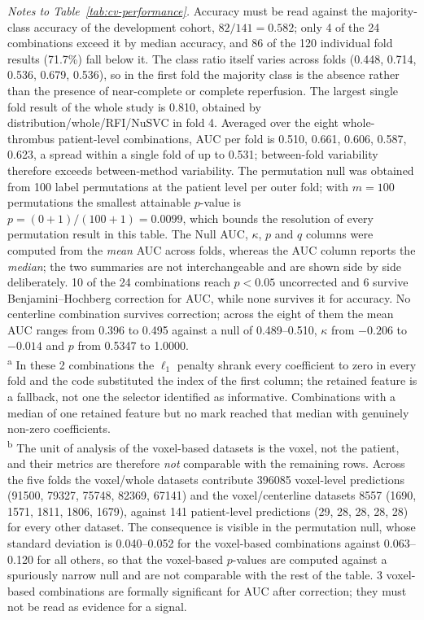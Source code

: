 \smallskip
{\footnotesize
\sloppy
\noindent
\textit{Notes to Table~\ref{tab:cv-performance}.}
Accuracy must be read against the majority-class accuracy of the development cohort, $82/141 = 0.582$; only 4 of the 24 combinations exceed it by median accuracy, and 86 of the 120 individual fold results (71.7\%) fall below it.
The class ratio itself varies across folds (0.448, 0.714, 0.536, 0.679, 0.536), so in the first fold the majority class is the absence rather than the presence of near-complete or complete reperfusion.
The largest single fold result of the whole study is 0.810, obtained by distribution/whole/RFI/NuSVC in fold 4.
Averaged over the eight whole-thrombus patient-level combinations, AUC per fold is 0.510, 0.661, 0.606, 0.587, 0.623, a spread within a single fold of up to 0.531; between-fold variability therefore exceeds between-method variability.
The permutation null was obtained from 100 label permutations at the patient level per outer fold; with $m = 100$ permutations the smallest attainable $p$-value is $p = (0+1)/(100+1) = 0.0099$, which bounds the resolution of every permutation result in this table.
The Null AUC, $\kappa$, $p$ and $q$ columns were computed from the \emph{mean} AUC across folds, whereas the AUC column reports the \emph{median}; the two summaries are not interchangeable and are shown side by side deliberately.
10 of the 24 combinations reach $p < 0.05$ uncorrected and 6 survive Benjamini--Hochberg correction for AUC, while none survives it for accuracy.
No centerline combination survives correction; across the eight of them the mean AUC ranges from 0.396 to 0.495 against a null of 0.489--0.510, $\kappa$ from $-0.206$ to $-0.014$ and $p$ from 0.5347 to 1.0000.\\
\textsuperscript{a} In these 2 combinations the $\ell_1$ penalty shrank every coefficient to zero in every fold and the code substituted the index of the first column; the retained feature is a fallback, not one the selector identified as informative.
Combinations with a median of one retained feature but no mark reached that median with genuinely non-zero coefficients.\\
\textsuperscript{b} The unit of analysis of the voxel-based datasets is the voxel, not the patient, and their metrics are therefore \emph{not} comparable with the remaining rows.
Across the five folds the voxel/whole datasets contribute 396085 voxel-level predictions (91500, 79327, 75748, 82369, 67141) and the voxel/centerline datasets 8557 (1690, 1571, 1811, 1806, 1679), against 141 patient-level predictions (29, 28, 28, 28, 28) for every other dataset.
The consequence is visible in the permutation null, whose standard deviation is 0.040--0.052 for the voxel-based combinations against 0.063--0.120 for all others, so that the voxel-based $p$-values are computed against a spuriously narrow null and are not comparable with the rest of the table.
3 voxel-based combinations are formally significant for AUC after correction; they must not be read as evidence for a signal.
\par}


